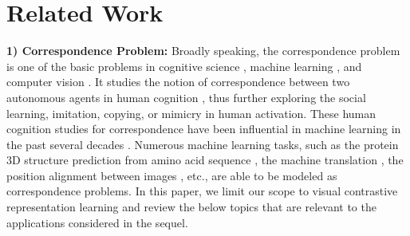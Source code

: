 \section{Related Work}
\label{sec:related}
\textbf{1) Correspondence Problem:} Broadly speaking, the correspondence problem is one of the basic problems in cognitive science \cite{nehaniv2002correspondence,brass2005imitation}, machine learning \cite{scholkopf2005object}, and computer vision \cite{he2021few}. It studies the notion of correspondence between two autonomous agents in human cognition \cite{nehaniv2002correspondence}, thus further exploring the social learning, imitation, copying, or mimicry in human activation. These human cognition studies for correspondence have been influential in machine learning in the past several decades \cite{lake2015human,scholkopf2005object}. Numerous machine learning tasks, such as the protein 3D structure prediction from amino acid sequence \cite{jumper2021highly}, the machine translation \cite{wu2016google}, the position alignment between images \cite{he2021few}, etc., are able to be modeled as correspondence problems. In this paper, we limit our scope to visual contrastive representation learning and review the below topics that are relevant to the applications considered in the sequel.

